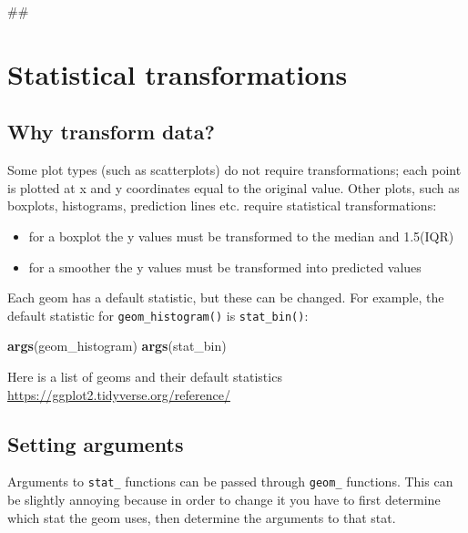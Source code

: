 \documentclass[]{book}
\newenvironment{Shaded}{\begin{snugshade}}{\end{snugshade}}
\newcommand{\KeywordTok}[1]{\textcolor[rgb]{0.13,0.29,0.53}{\textbf{#1}}}
\newcommand{\NormalTok}[1]{#1}
\providecommand{\tightlist}{%
  \setlength{\itemsep}{0pt}\setlength{\parskip}{0pt}}
\begin{document}
\begin{Shaded}
\begin{Highlighting}[]
\NormalTok{## }
\end{Highlighting}
\end{Shaded}

\section{Statistical transformations}\label{statistical-transformations}

\subsection{Why transform data?}\label{why-transform-data}

Some plot types (such as scatterplots) do not require transformations;
each point is plotted at x and y coordinates equal to the original
value. Other plots, such as boxplots, histograms, prediction lines etc.
require statistical transformations:

\begin{itemize}
\tightlist
\item
  for a boxplot the y values must be transformed to the median and
  1.5(IQR)
\item
  for a smoother the y values must be transformed into predicted values
\end{itemize}

Each geom has a default statistic, but these can be changed. For
example, the default statistic for \texttt{geom\_histogram()} is
\texttt{stat\_bin()}:

\begin{Shaded}
\begin{Highlighting}[]
\KeywordTok{args}\NormalTok{(geom_histogram)}
\KeywordTok{args}\NormalTok{(stat_bin)}
\end{Highlighting}
\end{Shaded}

Here is a list of geoms and their default statistics
\url{https://ggplot2.tidyverse.org/reference/}

\subsection{Setting arguments}\label{setting-arguments}

Arguments to \texttt{stat\_} functions can be passed through
\texttt{geom\_} functions. This can be slightly annoying because in
order to change it you have to first determine which stat the geom uses,
then determine the arguments to that stat.
\end{document}
